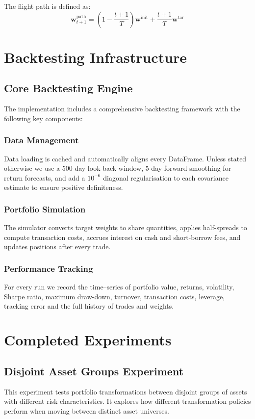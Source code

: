 \documentclass[11pt, letterpaper]{article}
\newcommand{\vect}[1]{\boldsymbol{#1}}
\begin{document}
The flight path is defined as:
\[
\vect{w}^{\text{path}}_{t+1} = (1 - \frac{t+1}{T}) \vect{w}^{\text{init}} + \frac{t+1}{T} \vect{w}^{\text{tar}}
\]

\section{Backtesting Infrastructure}

\subsection{Core Backtesting Engine}
The implementation includes a comprehensive backtesting framework with the following key components:

\subsubsection{Data Management}
Data loading is cached and automatically aligns every DataFrame.  Unless
stated otherwise we use a 500-day look-back window, 5-day forward smoothing for
return forecasts, and add a $10^{-6}$ diagonal regularisation to each
covariance estimate to ensure positive definiteness.

\subsubsection{Portfolio Simulation}
The simulator converts target weights to share quantities, applies half-spreads
to compute transaction costs, accrues interest on cash and short-borrow fees,
and updates positions after every trade.

\subsubsection{Performance Tracking}
For every run we record the time–series of portfolio value, returns, volatility,
Sharpe ratio, maximum draw-down, turnover, transaction costs, leverage,
tracking error and the full history of trades and weights.

\section{Completed Experiments}

\subsection{Disjoint Asset Groups Experiment}
This experiment tests portfolio transformations between disjoint groups of assets with different risk characteristics. It explores how different transformation policies perform when moving between distinct asset universes.
\end{document}
